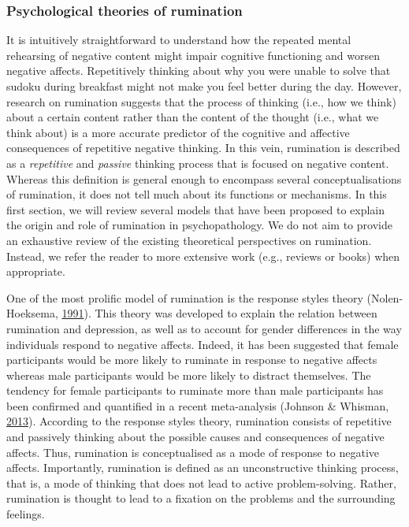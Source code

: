 \documentclass[a4paper,12pt,twoside,openright,oldfontcommands]{memoir}
\begin{document}
\hypertarget{psychological-theories-of-rumination}{%
\subsubsection{Psychological theories of rumination}\label{psychological-theories-of-rumination}}

It is intuitively straightforward to understand how the repeated mental rehearsing of negative content might impair cognitive functioning and worsen negative affects. Repetitively thinking about why you were unable to solve that sudoku during breakfast might not make you feel better during the day. However, research on rumination suggests that the process of thinking (i.e., how we think) about a certain content rather than the content of the thought (i.e., what we think about) is a more accurate predictor of the cognitive and affective consequences of repetitive negative thinking. In this vein, rumination is described as a \emph{repetitive} and \emph{passive} thinking process that is focused on negative content. Whereas this definition is general enough to encompass several conceptualisations of rumination, it does not tell much about its functions or mechanisms. In this first section, we will review several models that have been proposed to explain the origin and role of rumination in psychopathology. We do not aim to provide an exhaustive review of the existing theoretical perspectives on rumination. Instead, we refer the reader to more extensive work (e.g., reviews or books) when appropriate.

One of the most prolific model of rumination is the response styles theory (Nolen-Hoeksema, \protect\hyperlink{ref-nolen-hoeksema_responses_1991}{1991}). This theory was developed to explain the relation between rumination and depression, as well as to account for gender differences in the way individuals respond to negative affects. Indeed, it has been suggested that female participants would be more likely to ruminate in response to negative affects whereas male participants would be more likely to distract themselves. The tendency for female participants to ruminate more than male participants has been confirmed and quantified in a recent meta-analysis (Johnson \& Whisman, \protect\hyperlink{ref-Johnson2013}{2013}). According to the response styles theory, rumination consists of repetitive and passively thinking about the possible causes and consequences of negative affects. Thus, rumination is conceptualised as a mode of response to negative affects. Importantly, rumination is defined as an unconstructive thinking process, that is, a mode of thinking that does not lead to active problem-solving. Rather, rumination is thought to lead to a fixation on the problems and the surrounding feelings.
\end{document}
